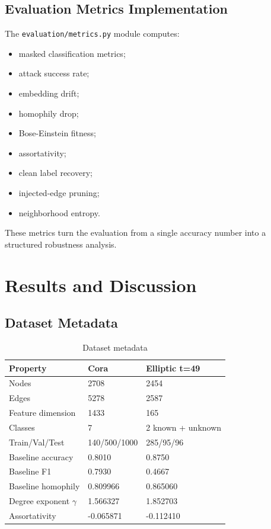 \documentclass[12pt,oneside]{report}
\begin{document}
\section{Evaluation Metrics Implementation}
The \texttt{evaluation/metrics.py} module computes:
\begin{itemize}
    \item masked classification metrics;
    \item attack success rate;
    \item embedding drift;
    \item homophily drop;
    \item Bose-Einstein fitness;
    \item assortativity;
    \item clean label recovery;
    \item injected-edge pruning;
    \item neighborhood entropy.
\end{itemize}

These metrics turn the evaluation from a single accuracy number into a structured robustness analysis.

\chapter{Results and Discussion}

\section{Dataset Metadata}
\begin{table}[H]
\centering
\caption{Dataset metadata}
\begin{tabular}{p{2.0in}p{1.5in}p{1.5in}}
\toprule
\textbf{Property} & \textbf{Cora} & \textbf{Elliptic t=49}\\
\midrule
Nodes & 2708 & 2454\\
Edges & 5278 & 2587\\
Feature dimension & 1433 & 165\\
Classes & 7 & 2 known + unknown\\
Train/Val/Test & 140/500/1000 & 285/95/96\\
Baseline accuracy & 0.8010 & 0.8750\\
Baseline F1 & 0.7930 & 0.4667\\
Baseline homophily & 0.809966 & 0.865060\\
Degree exponent $\gamma$ & 1.566327 & 1.852703\\
Assortativity & -0.065871 & -0.112410\\
\bottomrule
\end{tabular}
\end{table}
\end{document}
